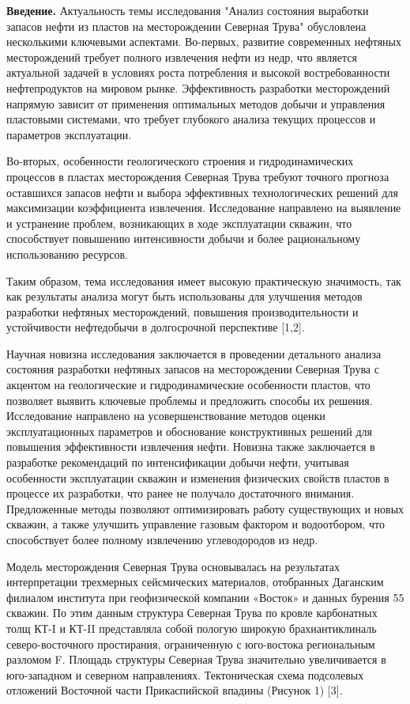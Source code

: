 \begin{multicols}{2}
{\bfseries Введение.} Актуальность темы исследования "Анализ состояния выработки
запасов нефти из пластов на месторождении Северная Трува" обусловлена
несколькими ключевыми аспектами. Во-первых, развитие современных
нефтяных месторождений требует полного извлечения нефти из недр, что
является актуальной задачей в условиях роста потребления и высокой
востребованности нефтепродуктов на мировом рынке. Эффективность
разработки месторождений напрямую зависит от применения оптимальных
методов добычи и управления пластовыми системами, что требует глубокого
анализа текущих процессов и параметров эксплуатации.

Во-вторых, особенности геологического строения и гидродинамических
процессов в пластах месторождения Северная Трува требуют точного
прогноза оставшихся запасов нефти и выбора эффективных технологических
решений для максимизации коэффициента извлечения. Исследование
направлено на выявление и устранение проблем, возникающих в ходе
эксплуатации скважин, что способствует повышению интенсивности добычи и
более рациональному использованию ресурсов.

Таким образом, тема исследования имеет высокую практическую значимость,
так как результаты анализа могут быть использованы для улучшения методов
разработки нефтяных месторождений, повышения производительности и
устойчивости нефтедобычи в долгосрочной перспективе {[}1,2{]}.

Научная новизна исследования заключается в проведении детального анализа
состояния разработки нефтяных запасов на месторождении Северная Трува с
акцентом на геологические и гидродинамические особенности пластов, что
позволяет выявить ключевые проблемы и предложить способы их решения.
Исследование направлено на усовершенствование методов оценки
эксплуатационных параметров и обоснование конструктивных решений для
повышения эффективности извлечения нефти. Новизна также заключается в
разработке рекомендаций по интенсификации добычи нефти, учитывая
особенности эксплуатации скважин и изменения физических свойств пластов
в процессе их разработки, что ранее не получало достаточного внимания.
Предложенные методы позволяют оптимизировать работу существующих и новых
скважин, а также улучшить управление газовым фактором и водоотбором, что
способствует более полному извлечению углеводородов из недр.

Модель месторождения Северная Трува основывалась на результатах
интерпретации трехмерных сейсмических материалов, отобранных Даганским
филиалом института при геофизической компании «Восток» и данных бурения
55 скважин. По этим данным структура Северная Трува по кровле
карбонатных толщ КТ-I и КТ-II представляла собой пологую широкую
брахиантиклиналь северо-восточного простирания, ограниченную с
юго-востока региональным разломом F. Площадь структуры Северная Трува
значительно увеличивается в юго-западном и северном направлениях.
Тектоническая схема подсолевых отложений Восточной части Прикаспийской
впадины (Рисунок 1) {[}3{]}.


\end{multicols}
